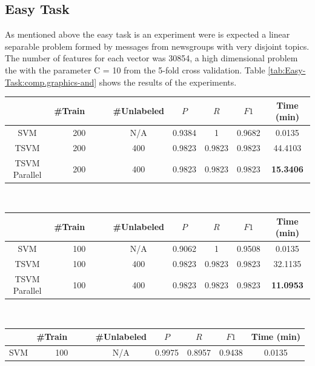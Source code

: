 \subsection{Easy Task}

As mentioned above the easy task is an experiment were is expected
a linear separable problem formed by messages from newsgroups with
very disjoint topics. The number of features for each vector was 30854,
a high dimensional problem the with the parameter C = 10 from the
5-fold cross validation. Table \ref{tab:Easy-Task:comp.graphics-and}
shows the results of the experiments. 

%
\begin{table}
\begin{longtable}
\begin{tabular}{|c|c|c|c|c|c||c|}
\hline
 & \#Train\ \ \ \ & \#Unlabeled & $P$  & $R$  & $F1$  & Time (min)\tabularnewline
\hline 
SVM & 200 & N/A & 0.9384 & 1 & 0.9682 & 0.0135\tabularnewline
\hline 
TSVM & 200 & 400 & 0.9823 & 0.9823 & 0.9823 & 44.4103\tabularnewline
\hline 
TSVM Parallel & 200 & 400 & 0.9823 & 0.9823 & 0.9823 & \textbf{15.3406}\tabularnewline
\hline
\end{tabular}\\
\tabularnewline
\tabularnewline
\begin{tabular}{|c|c|c|c|c|c||c|}
\hline 
 & \#Train\ \ \ \ & \#Unlabeled & $P$  & $R$  & $F1$  & Time (min)\tabularnewline
\hline 
SVM & 100 & N/A & 0.9062 & 1 & 0.9508 & 0.0135\tabularnewline
\hline 
TSVM & 100 & 400 & 0.9823 & 0.9823 & 0.9823 & 32.1135\tabularnewline
\hline 
TSVM Parallel & 100 & 400 & 0.9823 & 0.9823 & 0.9823 & \textbf{11.0953}\tabularnewline
\hline
\end{tabular} \\
\tabularnewline
\tabularnewline
\begin{tabular}{|c|c|c|c|c|c||c|}
\hline 
 & \#Train\ \ \ \ & \#Unlabeled & $P$  & $R$  & $F1$  & Time (min)\tabularnewline
\hline
\hline 
SVM & 100 & N/A & 0.9975 & 0.8957 & 0.9438 & 0.0135\tabularnewline

\end{tabular}
\end{longtable}
\end{table}
